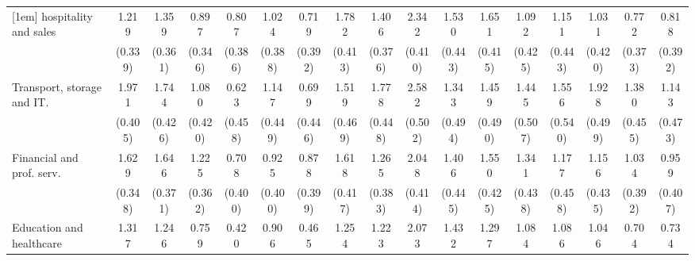 {\begin{tabular}{l*{16}{c}}
[1em]
hospitality and sales&       1.219\sym{***}&       1.359\sym{***}&       0.897\sym{**} &       0.807\sym{*}  &       1.024\sym{**} &       0.719         &       1.782\sym{***}&       1.406\sym{***}&       2.342\sym{***}&       1.530\sym{***}&       1.651\sym{***}&       1.092\sym{*}  &       1.151\sym{**} &       1.031\sym{*}  &       0.772\sym{*}  &       0.818\sym{*}  \\
                    &     (0.339)         &     (0.361)         &     (0.346)         &     (0.386)         &     (0.388)         &     (0.392)         &     (0.413)         &     (0.376)         &     (0.410)         &     (0.443)         &     (0.415)         &     (0.425)         &     (0.443)         &     (0.420)         &     (0.373)         &     (0.392)         \\
[1em]
Transport, storage and IT.&       1.971\sym{***}&       1.744\sym{***}&       1.080\sym{*}  &       0.623         &       1.147\sym{*}  &       0.699         &       1.519\sym{**} &       1.778\sym{***}&       2.582\sym{***}&       1.343\sym{**} &       1.459\sym{**} &       1.445\sym{**} &       1.556\sym{**} &       1.928\sym{***}&       1.380\sym{**} &       1.143\sym{*}  \\
                    &     (0.405)         &     (0.426)         &     (0.420)         &     (0.458)         &     (0.449)         &     (0.446)         &     (0.469)         &     (0.448)         &     (0.502)         &     (0.494)         &     (0.490)         &     (0.507)         &     (0.540)         &     (0.499)         &     (0.455)         &     (0.473)         \\
[1em]
Financial and prof. serv.&       1.629\sym{***}&       1.646\sym{***}&       1.225\sym{***}&       0.708         &       0.925\sym{*}  &       0.878\sym{*}  &       1.618\sym{***}&       1.265\sym{***}&       2.048\sym{***}&       1.406\sym{**} &       1.550\sym{***}&       1.341\sym{**} &       1.177\sym{*}  &       1.156\sym{**} &       1.034\sym{**} &       0.959\sym{*}  \\
                    &     (0.348)         &     (0.371)         &     (0.362)         &     (0.400)         &     (0.400)         &     (0.399)         &     (0.417)         &     (0.383)         &     (0.414)         &     (0.445)         &     (0.425)         &     (0.438)         &     (0.458)         &     (0.435)         &     (0.392)         &     (0.407)         \\
[1em]
Education and healthcare&       1.317\sym{***}&       1.246\sym{***}&       0.759\sym{*}  &       0.420         &       0.906\sym{*}  &       0.465         &       1.254\sym{**} &       1.223\sym{**} &       2.073\sym{***}&       1.432\sym{**} &       1.297\sym{**} &       1.084\sym{*}  &       1.086\sym{*}  &       1.046\sym{*}  &       0.704         &       0.734         \\

\end{tabular}}
